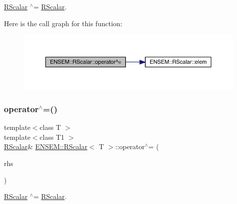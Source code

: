 \mbox{\hyperlink{classENSEM_1_1RScalar}{R\+Scalar}} $^\wedge$= \mbox{\hyperlink{classENSEM_1_1RScalar}{R\+Scalar}}. 

Here is the call graph for this function\+:
\nopagebreak
\begin{figure}[H]
\begin{center}
\leavevmode
\includegraphics[width=350pt]{d0/d8c/classENSEM_1_1RScalar_ad69bdf7cec58f8ef8a8a42b250d97b25_cgraph}
\end{center}
\end{figure}
\mbox{\label{classENSEM_1_1RScalar_ad69bdf7cec58f8ef8a8a42b250d97b25}} 
\subsubsection{\texorpdfstring{operator$^\wedge$=()}{operator^=()}\hspace{0.1cm}{\footnotesize\ttfamily [2/2]}}
{\footnotesize\ttfamily template$<$class T $>$ \\
template$<$class T1 $>$ \\
\mbox{\hyperlink{classENSEM_1_1RScalar}{R\+Scalar}}\& \mbox{\hyperlink{classENSEM_1_1RScalar}{E\+N\+S\+E\+M\+::\+R\+Scalar}}$<$ T $>$\+::operator$^\wedge$= (\begin{DoxyParamCaption}\item[{const \mbox{\hyperlink{classENSEM_1_1RScalar}{R\+Scalar}}$<$ T1 $>$ \&}]{rhs }\end{DoxyParamCaption})\hspace{0.3cm}{\ttfamily [inline]}}



\mbox{\hyperlink{classENSEM_1_1RScalar}{R\+Scalar}} $^\wedge$= \mbox{\hyperlink{classENSEM_1_1RScalar}{R\+Scalar}}. 

